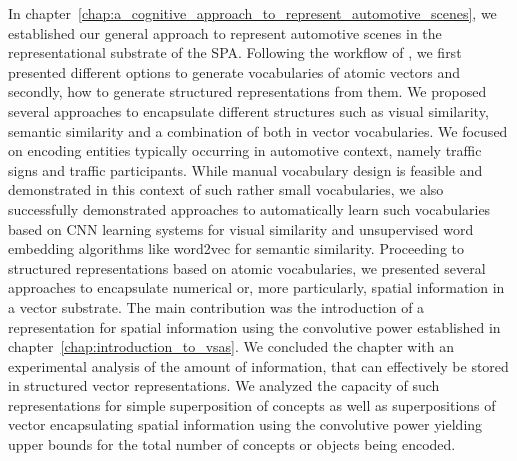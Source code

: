 In chapter~\ref{chap:a_cognitive_approach_to_represent_automotive_scenes}, we established our general approach to represent automotive scenes in the representational substrate of the \ac{SPA}.
Following the workflow of \textcite{Gallant2013}, we first presented different options to generate vocabularies of atomic vectors and secondly, how to generate structured representations from them. 
We proposed several approaches to encapsulate different structures such as visual similarity, semantic similarity and a combination of both in vector vocabularies.
We focused on encoding entities typically occurring in automotive context, namely traffic signs and traffic participants.
While manual vocabulary design is feasible and demonstrated in this context of such rather small vocabularies, we also successfully demonstrated approaches to automatically learn such vocabularies based on \ac{CNN} learning systems for visual similarity and unsupervised word embedding algorithms like word2vec for semantic similarity.
Proceeding to structured representations based on atomic vocabularies, we presented several approaches to encapsulate numerical or, more particularly, spatial information in a vector substrate.
The main contribution was the introduction of a representation for spatial information using the convolutive power established in chapter~\ref{chap:introduction_to_vsas}.
We concluded the chapter with an experimental analysis of the amount of information, that can effectively be stored in structured vector representations.
We analyzed the capacity of such representations for simple superposition of concepts as well as superpositions of vector encapsulating spatial information using the convolutive power yielding upper bounds for the total number of concepts or objects being encoded.
 
